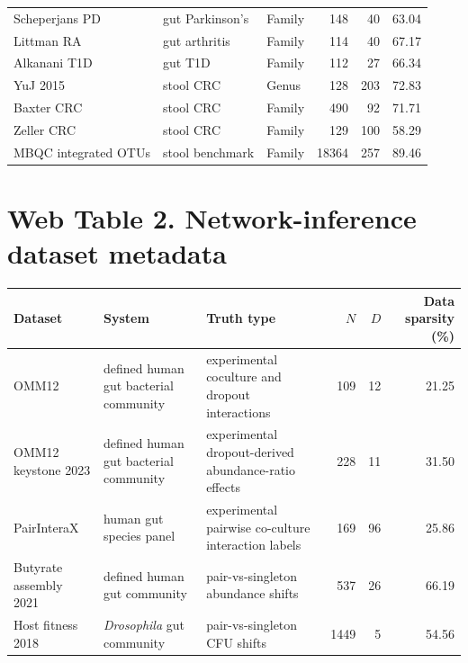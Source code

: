 \documentclass[11pt]{article}
\begin{document}
\begin{center}
\begin{tabular}{>{\raggedright\arraybackslash}p{}>{\raggedright\arraybackslash}p{}>{\raggedright\arraybackslash}p{}rrr}
Scheperjans PD & gut Parkinson's & Family & 148 & 40 & 63.04 \\
Littman RA & gut arthritis & Family & 114 & 40 & 67.17 \\
Alkanani T1D & gut T1D & Family & 112 & 27 & 66.34 \\
YuJ 2015 & stool CRC & Genus & 128 & 203 & 72.83 \\
Baxter CRC & stool CRC & Family & 490 & 92 & 71.71 \\
Zeller CRC & stool CRC & Family & 129 & 100 & 58.29 \\
MBQC integrated OTUs & stool benchmark & Family & 18364 & 257 & 89.46 \\
\bottomrule
\end{tabular}
\end{center}
\normalsize

\section*{Web Table 2. Network-inference dataset metadata}
\small
\begin{center}
\begin{tabular}{>{\raggedright\arraybackslash}p{}>{\raggedright\arraybackslash}p{}>{\raggedright\arraybackslash}p{}rrr}
\toprule
Dataset & System & Truth type & $N$ & $D$ & Data sparsity (\%) \\
\midrule
OMM12 & defined human gut bacterial community & experimental coculture and dropout interactions & 109 & 12 & 21.25 \\
OMM12 keystone 2023 & defined human gut bacterial community & experimental dropout-derived abundance-ratio effects & 228 & 11 & 31.50 \\
PairInteraX & human gut species panel & experimental pairwise co-culture interaction labels & 169 & 96 & 25.86 \\
Butyrate assembly 2021 & defined human gut community & pair-vs-singleton abundance shifts & 537 & 26 & 66.19 \\
Host fitness 2018 & \textit{Drosophila} gut community & pair-vs-singleton CFU shifts & 1449 & 5 & 54.56 \\
\bottomrule
\end{tabular}
\end{center}
\normalsize
\end{document}
